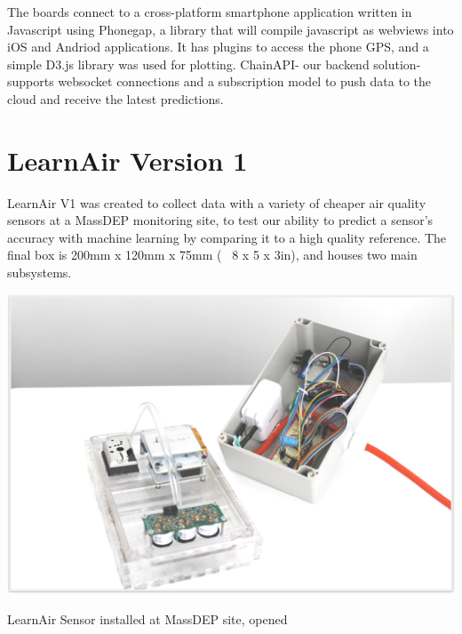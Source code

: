 The boards connect to a cross-platform smartphone application written in Javascript using Phonegap, a library that will compile javascript as webviews into iOS and Andriod applications.  It has plugins to access the phone GPS, and a simple D3.js library was used for plotting.  ChainAPI- our backend solution- supports  websocket connections and a subscription model to push data to the cloud and receive the latest predictions.



\section{LearnAir Version 1}
\FloatBarrier

LearnAir V1 was created to collect data with a variety of cheaper air quality sensors at a MassDEP monitoring site, to test our ability to predict a sensor's accuracy with machine learning by comparing it to a high quality reference.  The final box is 200mm x 120mm x 75mm (~ 8 x 5 x 3in), and houses two main subsystems.

\begin{marginfigure}
 	\includegraphics[width=\textwidth]{visuals/learnairV1}               
 	 \caption{LearnAir Sensor installed at MassDEP site, opened}
  	\label{fig:learnairv1}
\end{marginfigure}

